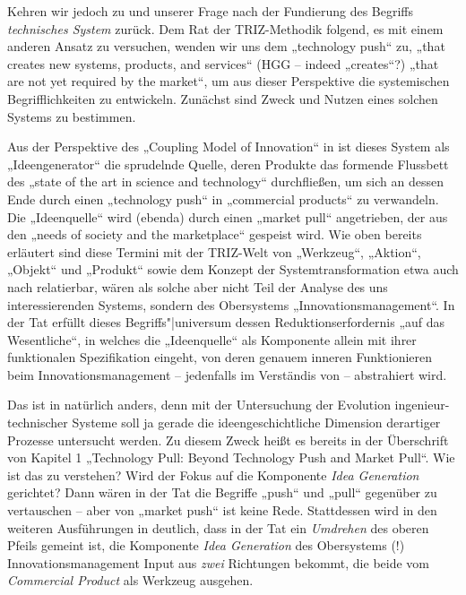 \documentclass[11pt,a4paper]{article}
\begin{document}
Kehren wir jedoch zu \cite{TESE2018} und unserer Frage nach der Fundierung des
Begriffs \emph{technisches System} zurück. Dem Rat der TRIZ-Methodik folgend,
es mit einem anderen Ansatz zu versuchen, wenden wir uns dem „technology push“
\cite[S. 2]{TESE2018} zu, „that creates new systems, products, and services“
(HGG -- indeed „creates“?) „that are not yet required by the market“, um aus
dieser Perspektive die systemischen Begrifflichkeiten zu entwickeln. Zunächst
sind Zweck und Nutzen eines solchen Systems zu bestimmen.

Aus der Perspektive des „Coupling Model of Innovation“ in
\cite[Fig. 3]{Preez2006} ist dieses System als „Ideengenerator“ die sprudelnde
Quelle, deren Produkte das formende Flussbett des „state of the art in science
and technology“ durchfließen, um sich an dessen Ende durch einen „technology
push“ in „commercial products“ zu verwandeln.  Die „Ideenquelle“ wird (ebenda)
durch einen „market pull“ angetrieben, der aus den „needs of society and the
marketplace“ gespeist wird. Wie oben bereits erläutert sind diese Termini mit
der TRIZ-Welt von „Werkzeug“, „Aktion“, „Objekt“ und „Produkt“ sowie dem
Konzept der Systemtransformation etwa auch nach \cite{TT} relatierbar, wären
als solche aber nicht Teil der Analyse des uns interessierenden Systems,
sondern des Obersystems „Innovationsmanagement“. In der Tat erfüllt dieses
Begriffs"|universum dessen Reduktionserfordernis „auf das Wesentliche“, in
welches die „Ideenquelle“ als Komponente allein mit ihrer funktionalen
Spezifikation eingeht, von deren genauem inneren Funktionieren beim
Innovationsmanagement -- jedenfalls im Verständis von \cite{Preez2006} --
abstrahiert wird.

Das ist in \cite{TESE2018} natürlich anders, denn mit der Untersuchung der
Evolution ingenieur-technischer Systeme soll ja gerade die ideengeschichtliche
Dimension derartiger Prozesse untersucht werden.  Zu diesem Zweck heißt es
bereits in der Überschrift von Kapitel 1 „Technology Pull: Beyond Technology
Push and Market Pull“.  Wie ist das zu verstehen? Wird der Fokus auf die
Komponente \emph{Idea Generation} gerichtet? Dann wären in der Tat die
Begriffe „push“ und „pull“ gegenüber \cite{Preez2006} zu vertauschen -- aber
von „market push“ ist keine Rede.  Stattdessen wird in den weiteren
Ausführungen in \cite{TESE2018} deutlich, dass in der Tat ein \emph{Umdrehen}
des oberen Pfeils gemeint ist, die Komponente \emph{Idea Generation} des
Obersystems (!) Innovationsmanagement Input aus \emph{zwei} Richtungen
bekommt, die beide vom \emph{Commercial Product} als Werkzeug ausgehen.
\end{document}

